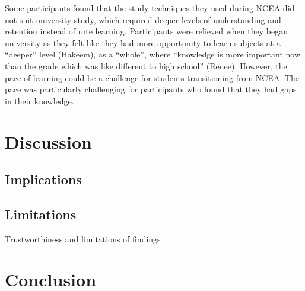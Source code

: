 \documentclass[a4paper,man,natbib]{apa6}
\begin{document}
Some participants found that the study techniques they used during NCEA did not suit university study, which required deeper levels of understanding and retention instead of rote learning. Participants were relieved when they began university as they felt like they had more opportunity to learn subjects at a ``deeper'' level (Hakeem), as a ``whole'', where ``knowledge is more important now than the grade which was like different to high school'' (Renee). However, the pace of learning could be a challenge for students transitioning from NCEA. The pace was particularly challenging for participants who found that they had gaps in their knowledge.

\section{Discussion}

\subsection*{Implications}


\subsection{Limitations} Trustworthiness and limitations of findings 


\section{Conclusion}
\end{document}
